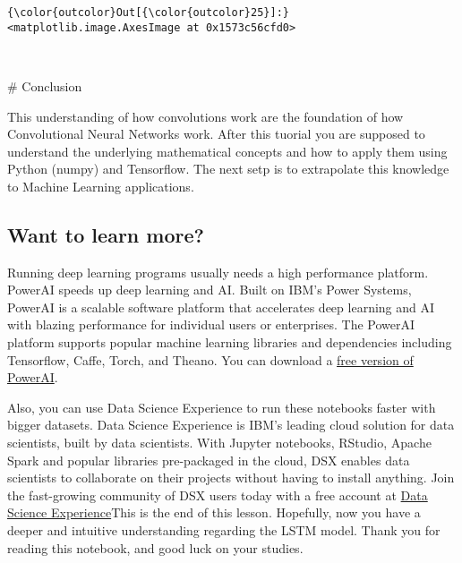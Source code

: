 \documentclass[11pt]{article}
\begin{document}
\begin{Verbatim}[commandchars=\\\{\}]
{\color{outcolor}Out[{\color{outcolor}25}]:} <matplotlib.image.AxesImage at 0x1573c56cfd0>
\end{Verbatim}
            
    \begin{center}
    \end{center}
    { \hspace*{\fill} \\}
    
     \# Conclusion

This understanding of how convolutions work are the foundation of how
Convolutional Neural Networks work. After this tuorial you are supposed
to understand the underlying mathematical concepts and how to apply them
using\textbar{} Python (numpy) and Tensorflow. The next setp is to
extrapolate this knowledge to Machine Learning applications.

    \subsection{Want to learn more?}\label{want-to-learn-more}

Running deep learning programs usually needs a high performance
platform. PowerAI speeds up deep learning and AI. Built on IBM's Power
Systems, PowerAI is a scalable software platform that accelerates deep
learning and AI with blazing performance for individual users or
enterprises. The PowerAI platform supports popular machine learning
libraries and dependencies including Tensorflow, Caffe, Torch, and
Theano. You can download a \href{https://cocl.us/ML0120EN_PAI}{free
version of PowerAI}.

Also, you can use Data Science Experience to run these notebooks faster
with bigger datasets. Data Science Experience is IBM's leading cloud
solution for data scientists, built by data scientists. With Jupyter
notebooks, RStudio, Apache Spark and popular libraries pre-packaged in
the cloud, DSX enables data scientists to collaborate on their projects
without having to install anything. Join the fast-growing community of
DSX users today with a free account at
\href{https://cocl.us/ML0120EN_DSX}{Data Science Experience}This is the
end of this lesson. Hopefully, now you have a deeper and intuitive
understanding regarding the LSTM model. Thank you for reading this
notebook, and good luck on your studies.
\end{document}
